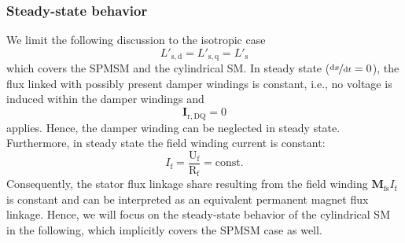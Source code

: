 \begin{frame}
	\frametitle{Steady-state behavior}
	We limit the following discussion to the isotropic case
	$$L'_\mathrm{s,d} =  L'_\mathrm{s,q} =L'_\mathrm{s}$$
	which covers the SPMSM and the cylindrical SM. In steady state ($\nicefrac{\mathrm{d}x}{\mathrm{d}t} = 0$), the flux linked with possibly present damper windings is constant, i.e., no voltage is induced within the damper windings and $$\bm{I}_\mathrm{r,DQ} = 0$$ applies. Hence, the damper winding can be neglected in steady state. Furthermore, in steady state the field winding current is constant: $$I_\mathrm{f} = \frac{\mathrm{U}_\mathrm{f} }{\mathrm{R}_\mathrm{f}} = \mathrm{const.}$$
	Consequently, the stator flux linkage share resulting from the field winding $\bm{M}_\mathrm{fs} I_{\mathrm{f}}$ is constant and can be interpreted as an equivalent permanent magnet flux linkage. Hence, we will focus on the steady-state behavior of the cylindrical SM in the following, which implicitly covers the SPMSM case as well.
\end{frame}

